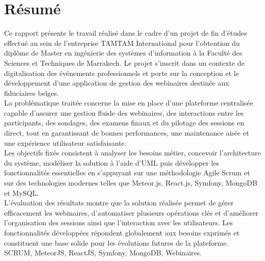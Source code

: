 \documentclass{rapportPFEHIND}
\begin{document}
\section*{Résumé}
Ce rapport présente le travail réalisé dans le cadre d'un projet de fin d'études effectué au sein de l'entreprise TAMTAM International pour l'obtention du diplôme de Master en ingénierie des systèmes d'information à la Faculté des Sciences et Techniques de Marrakech. Le projet s'inscrit dans un contexte de digitalisation des événements professionnels et porte sur la conception et le développement d'une application de gestion des webinaires destinée aux fiduciaires belges.\\[6pt]
La problématique traitée concerne la mise en place d'une plateforme centralisée capable d'assurer une gestion fluide des webinaires, des interactions entre les participants, des sondages, des examens finaux et du pilotage des sessions en direct, tout en garantissant de bonnes performances, une maintenance aisée et une expérience utilisateur satisfaisante.\\[6pt]
Les objectifs fixés consistent à analyser les besoins métier, concevoir l'architecture du système, modéliser la solution à l'aide d'UML puis développer les fonctionnalités essentielles en s'appuyant sur une méthodologie Agile Scrum et sur des technologies modernes telles que Meteor.js, React.js, Symfony, MongoDB et MySQL.\\[6pt]
L'évaluation des résultats montre que la solution réalisée permet de gérer efficacement les webinaires, d'automatiser plusieurs opérations clés et d'améliorer l'organisation des sessions ainsi que l'interaction avec les utilisateurs. Les fonctionnalités développées répondent globalement aux besoins exprimés et constituent une base solide pour les évolutions futures de la plateforme.\\[6pt]

 SCRUM, MeteorJS, ReactJS, Symfony, MongoDB, Webinaires.
\clearpage

{}
\end{document}
